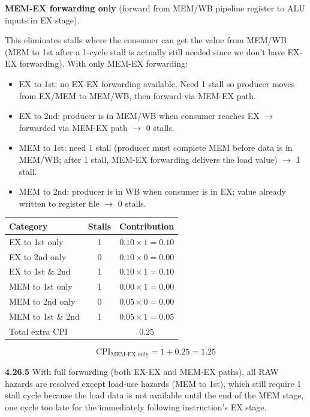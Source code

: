 \textbf{MEM-EX forwarding only}
(forward from MEM/WB pipeline register to ALU inputs in EX stage).

This eliminates stalls where the consumer can get the value from MEM/WB
(MEM to 1st after a 1-cycle stall is actually still needed since we don't
have EX-EX forwarding). With only MEM-EX forwarding:
\begin{itemize}
  \item EX to 1st: no EX-EX forwarding available. Need 1 stall so producer
    moves from EX/MEM to MEM/WB, then forward via MEM-EX path.
  \item EX to 2nd: producer is in MEM/WB when consumer reaches EX $\to$
    forwarded via MEM-EX path $\to$ 0 stalls.
  \item MEM to 1st: need 1 stall (producer must complete MEM before data is
    in MEM/WB; after 1 stall, MEM-EX forwarding delivers the load value) $\to$
    1 stall.
  \item MEM to 2nd: producer is in WB when consumer is in EX; value already
    written to register file $\to$ 0 stalls.
\end{itemize}

\begin{center}
\begin{tabular}{lcc}
\toprule
\textbf{Category} & \textbf{Stalls} & \textbf{Contribution} \\
\midrule
EX to 1st only     & 1 & $0.10 \times 1 = 0.10$ \\
EX to 2nd only     & 0 & $0.10 \times 0 = 0.00$ \\
EX to 1st \& 2nd   & 1 & $0.10 \times 1 = 0.10$ \\
MEM to 1st only    & 1 & $0.00 \times 1 = 0.00$ \\
MEM to 2nd only    & 0 & $0.05 \times 0 = 0.00$ \\
MEM to 1st \& 2nd  & 1 & $0.05 \times 1 = 0.05$ \\
\midrule
\multicolumn{2}{l}{Total extra CPI} & $0.25$ \\
\bottomrule
\end{tabular}
\end{center}
\[
  \text{CPI}_{\text{MEM-EX only}} = 1 + 0.25 = 1.25
\]

\medskip\noindent\textbf{4.26.5}
With full forwarding (both EX-EX and MEM-EX paths), all RAW hazards are
resolved except load-use hazards (MEM to 1st), which still require 1 stall
cycle because the load data is not available until the end of the MEM stage,
one cycle too late for the immediately following instruction's EX stage.

